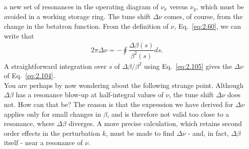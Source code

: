  a new set of resonances in the operating diagram of $\nu_x$ versus $\nu_y$, which must be avoided in a working storage ring.
The tune shift $\Delta\nu$ comes, of course, from the change in the betatron function. From the definition of $\nu$, Eq.~\eqref{eq:2.60}, we can write that
\begin{align}
	2\pi\Delta\nu = -\oint \dfrac{\Delta\beta(s)}{\beta^2(s)}ds.
\end{align}
A straightforward integration over $s$ of $\Delta\beta/\beta^2$ using Eq.~\eqref{eq:2.105} gives the $\Delta\nu$ of Eq.~\eqref{eq:2.104}.\\
You are perhaps by now wondering about the following strange point. Although $\Delta\beta$ has a resonance blow-up at half-integral values of $\nu$, the tune shift $\Delta\nu$ does not. How can that be? The reason is that the expression we have derived for $\Delta\nu$ applies only for small changes in $\beta$, and is therefore not valid too close to a resonance, where $\Delta\beta$ diverges. A more precise calculation, which retains second order effects in the perturbation $k$, must be made to find $\Delta\nu$ - and, in fact, $\Delta\beta$ itself - near a resonance of $\nu$.
